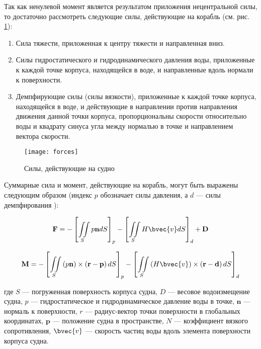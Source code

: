Так как ненулевой момент является результатом приложения нецентральной силы, то достаточно рассмотреть следующие силы, действующие на корабль (см. рис. \ref{boat_forces}):
\begin{enumerate}
	\item	Сила тяжести, приложенная к центру тяжести и 
			направленная вниз.
	\item	Силы гидростатического и гидродинамического давления воды, приложенные к каждой точке корпуса, 
			находящейся в воде, и направленные вдоль нормали к поверхности.
	\item	Демпфирующие силы (силы вязкости), приложенные к каждой точке корпуса, 
			находящейся в воде, и действующие в направлении против 
			направления движения  данной точки корпуса, пропорциональны скорости 
			относительно воды и квадрату синуса угла между нормалью в точке и направлением 
			вектора скорости.
\end{enumerate}

\begin{figure}[ht]
\begin{center}
\texttt{[image: forces]}
\end{center}
\caption{Силы, действующие на судно}
\label{boat_forces}
\end{figure}

Суммарные сила и момент, действующие на корабль, могут быть выражены следующим образом (индекс $p$ обозначает силы давления, а $d$ --- силы демпфирования ):

\begin{equation}
	\mathbf{F} = 
		-\left[ \iint\limits_{S} p \mathbf{n} dS 	\right]_{p}
		-\left[ \iint\limits_{S} H \bvec{v} dS 	\right]_{d}
		+ \mathbf{D}
	\label{F=integral}
\end{equation}

\begin{equation}
	\mathbf{M} = 
	-\left[ 
		\iint\limits_{S} 
		\left( p \mathbf{n} \right) \times 
		\left( \mathbf{r} - \mathbf{p} \right) dS	
	\right]_{p}
	-\left[ \iint\limits_{S} 
		\left( H \bvec{v} \right) \times 
		\left( \mathbf{r} - \mathbf{d} \right) dS	
	\right]_{d}
	\label{M=integral}
\end{equation}

где $S$ --- погруженная поверхность корпуса судна, $D$ --- весовое водоизмещение судна, $p$ --- гидростатическое и гидродинамическое давление воды в точке, $\mathbf{n}$ --- нормаль к поверхности, $r$ --- радиус-вектор точки поверхности в глобальных координатах, $\mathbf{p}$ --- положение судна в пространстве, $N$ --- коэффициент вязкого сопротивления, $\bvec{v}$ --- скорость частиц воды вдоль элемента поверхности корпуса судна.

